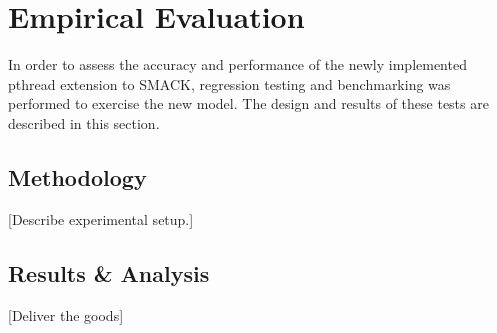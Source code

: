 \chapter{Empirical Evaluation}\label{ch:evaluation}
In order to assess the accuracy and performance of the newly
implemented pthread extension to SMACK, regression testing and
benchmarking was performed to exercise the new model.  The design and
results of these tests are described in this section. 

\section{Methodology}
[Describe experimental setup.]

\section{Results \& Analysis}
[Deliver the goods]

